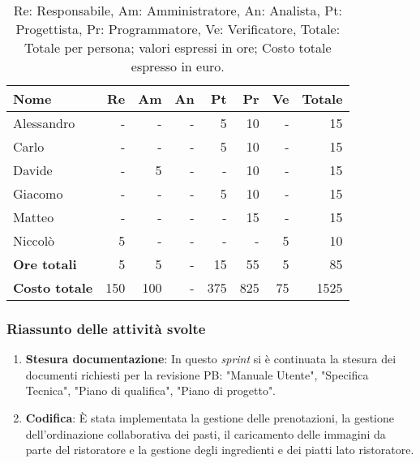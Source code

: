 \begin{table}[H]
	\centering
	\begin{tabular}{l|r|r|r|r|r|r|r}
		\textbf{Nome}         & \textbf{Re} & \textbf{Am} & \textbf{An} & \textbf{Pt} & \textbf{Pr} & \textbf{Ve} & \textbf{Totale} \\
		\hline
		Alessandro            & -           & -           & -           & 5           & 10           & -           & 15              \\
		Carlo                 & -           & -           & -           & 5           & 10           & -           & 15              \\
		Davide                & -           & 5           & -           & -           & 10           & -           & 15              \\
		Giacomo               & -           & -           & -           & 5           & 10          	& -           & 15              \\
		Matteo                & -           & -           & -           & -           & 15           & -           & 15              \\
		Niccolò               & 5           & -           & -           & -           & -           & 5           & 10              \\
		\hline
		\textbf{Ore totali}   & 5           & 5           & -           & 15          & 55          & 5          & 85              \\
		\textbf{Costo totale} & 150         & 100         & -           & 375         & 825         & 75         & 1525
	\end{tabular}
	\caption{Re: Responsabile, Am: Amministratore, An: Analista, Pt: Progettista,
		Pr: Programmatore, Ve: Verificatore, Totale: Totale per persona; valori espressi in ore; Costo totale espresso in euro.}
\end{table}

\subsubsection{Riassunto delle attività svolte}

\begin{enumerate}
	\item \textbf{Stesura documentazione}: In questo \textit{sprint} si è continuata la stesura dei documenti richiesti per la revisione PB: "Manuale Utente", "Specifica Tecnica", "Piano di qualifica", "Piano di progetto".

	\item \textbf{Codifica}: È stata implementata la gestione delle prenotazioni, la gestione dell'ordinazione collaborativa dei pasti, il caricamento delle immagini da parte del ristoratore e la gestione degli ingredienti e dei piatti lato ristoratore.
\end{enumerate}

